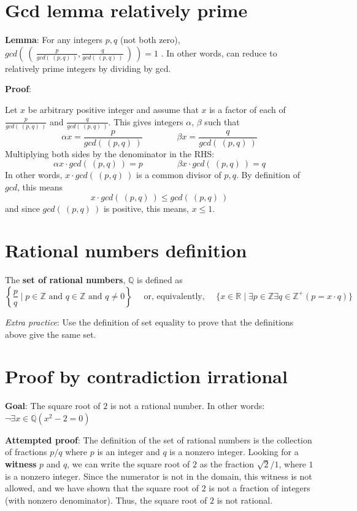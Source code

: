 \documentclass[12pt, oneside]{article}
\begin{document}
\vspace{150pt}
 \vfill
\section*{Gcd lemma relatively prime}


{\bf Lemma}: For any integers $p, q$ (not both zero), 
$gcd \left(~ \left(~\frac{p}{gcd(~(p,q)~)}, \frac{q}{gcd(~(p,q)~)} ~\right) ~\right) = 1$ .
In other words, can reduce to relatively prime integers by dividing by gcd.

{\bf Proof}:

Let $x$ be arbitrary positive integer and assume that $x$ is a 
factor of each of $\frac{p}{gcd(~(p,q)~)}$ and $\frac{q}{gcd(~(p,q)~)}$. 
This gives integers $\alpha$, $\beta$ such that 
\[
    \alpha x = \frac{p}{gcd(~(p,q)~)} \qquad \qquad \beta x = \frac{q}{gcd(~(p,q)~)}
\]
Multiplying both sides by the denominator in the RHS: 
\[
    \alpha x \cdot gcd(~(p,q)~)= p \qquad \qquad \beta x \cdot gcd(~(p,q)~)= q
\]
In other words, $x \cdot gcd(~(p,q)~)$ is a common divisor of $p, q$. By definition of $gcd$, this means
\[
    x \cdot gcd (~(p,q)~) \leq gcd (~(p,q)~)
\]
and since $gcd(~(p,q)~)$ is positive, this means, $x \leq 1$.
\vspace{350pt}
 \vfill
\section*{Rational numbers definition}


The {\bf set  of rational numbers}, $\mathbb{Q}$  is defined as 
\[
\left\{ \frac{p}{q} \mid p \in \mathbb{Z}  \text{ and  } q  \in \mathbb{Z} \text{ and } q \neq  0 \right\}
\text{~~~~or, equivalently,~~~~}
\{ x  \in  \mathbb{R} \mid \exists p \in \mathbb{Z}  \exists q \in \mathbb{Z}^+ ( p =  x \cdot q) \}
\]

{\it Extra practice}: Use the definition of set equality to prove that the definitions above  give the same set.

 \vfill
\section*{Proof by contradiction irrational}


{\bf Goal}:  The square root of $2$ is not a rational number.  In other words: $\neg \exists x \in \mathbb{Q} ( x^2 -  2 = 0)$

{\bf Attempted proof}: The definition of the set of rational numbers is the collection of fractions $p/q$ where $p$ is an integer and $q$ is a nonzero integer. Looking for a {\bf witness} $p$ and $q$, we can write the square root of $2$ as the fraction 
$\sqrt{2 }/1$, where $1$ is a nonzero integer. Since the numerator is not in the domain, this witness is not allowed, and we have shown that the square root of $2$ is not a fraction of integers (with nonzero denominator). Thus, the square root of $2$ is not rational.
\end{document}
